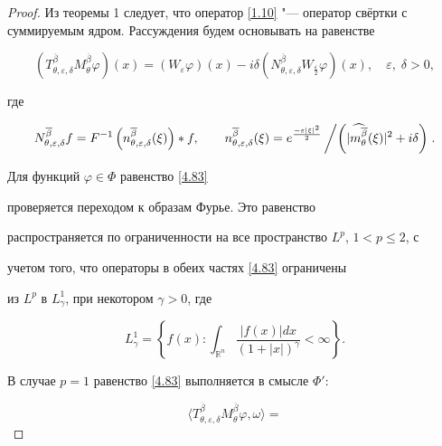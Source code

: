 \begin{proof}

Из теоремы 1 следует, что оператор \eqref{1.10} "--- оператор свёртки с суммируемым ядром. Рассуждения будем основывать на равенстве

\begin{equation}\label{4.83}

 (T_{\theta,\varepsilon,\delta}^{\overline{\beta}}M_{\theta}^{\overline{\beta}}\varphi)(x)=(W_\varepsilon

 \varphi)(x)-i\delta

 (N_{\theta,\varepsilon,\delta}^{\overline{\beta}}W_{\frac\varepsilon 2}

 \varphi)(x),\quad  \varepsilon, \; \delta>0,

\end{equation}

где

\begin{equation}\label{4.84}

 N_{\theta,\varepsilon,\delta}^{\overline{\beta}}f

 =F^{-1}\left(n_{\theta,\varepsilon,\delta}^{\overline{\beta}}(\xi)\right)*f,\qquad

 n_{\theta,\varepsilon,\delta}^{\overline{\beta}}(\xi)={

 e^\frac{-\varepsilon|\xi|^2}2}\left/

 \left({|\widehat{m_{\theta}^{\overline{\beta}}}(\xi)|^2+i\delta}\right)\right..\nonumber

\end{equation}

 Для функций $\varphi\in\Phi$ равенство \eqref{4.83}

проверяется переходом к образам Фурье. Это равенство

распространяется по ограниченности на все пространство $L^p$, $1< p\leq 2$, с

учетом того, что операторы в обеих частях \eqref{4.83} ограничены

из $L^p$ в $L^1_{\gamma}$, при некотором $\gamma>0$, где

$$L^1_{\gamma}=\left\{f(x): \int_{\mathbb R^n}\frac{|f(x)|dx}{(1+|x|)^\gamma}<\infty \right\}.$$

В случае $p=1$ равенство \eqref{4.83} выполняется в смысле $\Phi'$:

\begin{equation}\label{1.11}

 \langle T_{\theta,\varepsilon,\delta}^{\overline{\beta}}M_{\theta}^{\overline{\beta}}\varphi, \omega \rangle=


\end{equation}
\end{proof}
